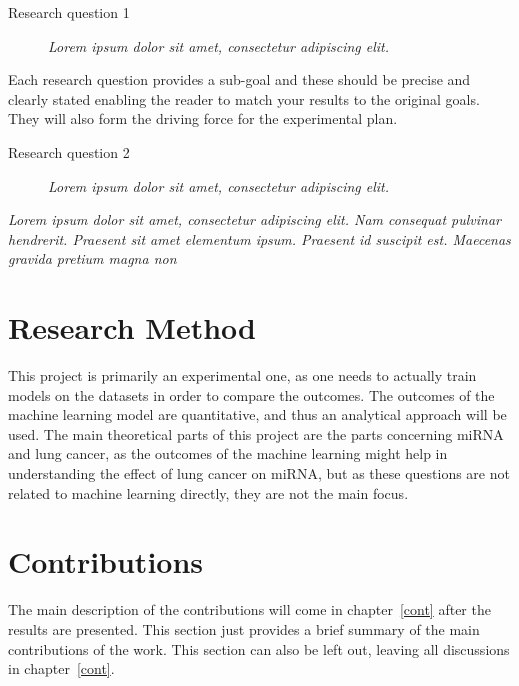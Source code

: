 \begin{description}
\item[Research question 1] {\it Lorem ipsum dolor sit amet, consectetur adipiscing elit.}
\end{description}

Each research question provides a sub-goal and these should be precise and clearly stated enabling the reader to match your results to the original goals. They will also form the driving force for the experimental plan. 

\begin{description}
\item[Research question 2] {\it Lorem ipsum dolor sit amet, consectetur adipiscing elit.}
\end{description}

{\it Lorem ipsum dolor sit amet, consectetur adipiscing elit. Nam consequat pulvinar hendrerit. Praesent sit amet elementum ipsum. Praesent id suscipit est. Maecenas gravida pretium magna non }
\fi

\section{Research Method}
\label{sec:researchMethod}

This project is primarily an experimental one, as one needs to actually train models on the datasets in order to compare the outcomes. The outcomes of the machine learning model are quantitative, and thus an analytical approach will be used. The main theoretical parts of this project are the parts concerning miRNA and lung cancer, as the outcomes of the machine learning might help in understanding the effect of lung cancer on miRNA, but as these questions are not related to machine learning directly, they are not the main focus.
\iffalse
What methodology will you apply to address the goals: theoretic/analytic, model/abstraction or design/experiment? This section will describe the research methodology applied and the reason for this choice of research methodology.  
\fi

\iffalse
\section{Contributions}
\label{sec:IntroContributions}

The main description of the contributions will come in chapter~\ref{cont} after the results are presented. This section just provides a brief summary of the main contributions of the work. This section can also be left out, leaving all discussions in chapter~\ref{cont}.


